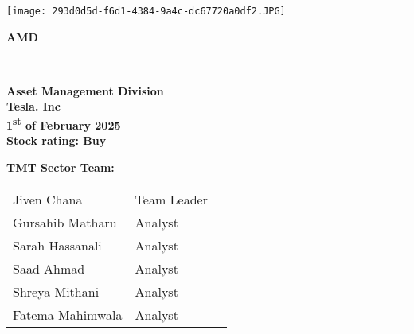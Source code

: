 \documentclass[12pt]{article}
\begin{document}
\begin{center}
    \texttt{[image: 293d0d5d-f6d1-4384-9a4c-dc67720a0df2.JPG]} %
\end{center}

\vspace*{1cm}


\begin{center}
    {\fontsize{72}{72}\selectfont \textcolor[rgb]{0.1, 0.2, 0.5}{\Huge \textbf{AMD}}}\\
    \color[rgb]{1.0, 0.8, 0.0}\rule{0.4\textwidth}{1pt} \\[10pt] %
    \textcolor[rgb]{0.1, 0.2, 0.5}{\textbf{\large Asset Management Division}} \\[20pt]
    \vspace*{2cm}
    {\textcolor[rgb]{0.0, 0.0, 0.0}{\Large \textbf{Tesla. Inc}}} \\[10pt]
    {\textcolor[rgb]{0.3, 0.3, 0.3}{\textbf{\normalsize 1\textsuperscript{st} of February 2025}}} \\[20pt]
    {\textcolor[rgb]{0.0, 0.0, 0.0}{\Large \textbf{Stock rating: Buy}}}
    \vspace*{2cm}
\end{center}

\vspace{1cm}



\begin{center}
    \textbf{\textcolor[rgb]{0.0, 0.0, 0.0}{TMT Sector Team:}} \\[10pt]
    \begin{tabular}{l l l}
        \textcolor[rgb]{0.3, 0.3, 0.3}{Jiven Chana} & \textcolor[rgb]{0.3, 0.3, 0.3}{Team Leader} & \\
        \textcolor[rgb]{0.3, 0.3, 0.3}{Gursahib Matharu} & \textcolor[rgb]{0.3, 0.3, 0.3}{Analyst} & \\
        \textcolor[rgb]{0.3, 0.3, 0.3}{Sarah Hassanali} & \textcolor[rgb]{0.3, 0.3, 0.3}{Analyst} & \\
        \textcolor[rgb]{0.3, 0.3, 0.3}{Saad Ahmad} & \textcolor[rgb]{0.3, 0.3, 0.3}{Analyst} & \\
        \textcolor[rgb]{0.3, 0.3, 0.3}{Shreya Mithani} & \textcolor[rgb]{0.3, 0.3, 0.3}{Analyst} & \\
        \textcolor[rgb]{0.3, 0.3, 0.3}{Fatema Mahimwala} & \textcolor[rgb]{0.3, 0.3, 0.3}{Analyst} & \\
    \end{tabular}
\end{center}
\end{document}
